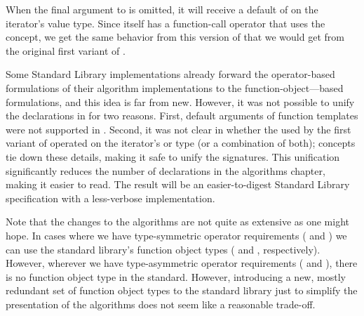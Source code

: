 \documentclass[american,twoside]{book}
\begin{document}
\begin{titlepage}
When the final argument to  is omitted, it will receive a
default of  on the iterator's value type. Since
 itself has a function-call operator that uses the
 concept, we get the same behavior from this
version of  that we would get from the original first
variant of .

Some Standard Library implementations already forward the
operator-based formulations of their algorithm implementations to the
function-object---based formulations, and this idea is far from
new. However, it was not possible to unify the declarations in 
for two reasons. First, default arguments of function templates were
not supported in . Second, it was not clear in  whether
the  used by the first variant of 
operated on the iterator's  or 
type (or a combination of both); concepts tie down these details,
making it safe to unify the signatures. This unification significantly
reduces the number of declarations in the algorithms chapter, making
it easier to read. The result will be an easier-to-digest Standard
Library specification with a less-verbose implementation.

Note that the changes to the algorithms are not quite as extensive as
one might hope. In cases where we have type-symmetric operator
requirements ( and
) we can use the standard library's function
object types ( and ,
respectively). However, wherever we have type-asymmetric operator
requirements ( and ), there is no
function object type in the standard. However, introducing a new,
mostly redundant set of function object types to the standard library
just to simplify the presentation of the algorithms does not seem like
a reasonable trade-off.
\end{titlepage}

\pagestyle{fancy}
\fancyhead[LE,RO]{\textbf{\rightmark}}
\fancyhead[RE]{\textbf{\leftmark\hspace{1em}\thepage}}
\fancyhead[LO]{\textbf{\thepage\hspace{1em}\leftmark}}

\end{document}
